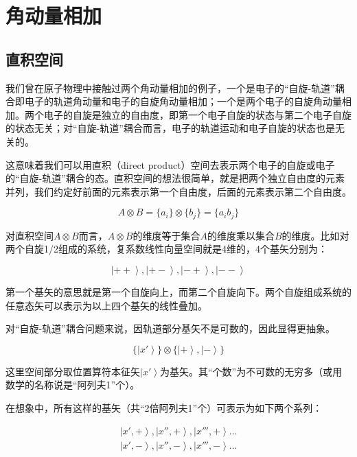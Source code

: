 \section{角动量相加}

\subsection{直积空间}

我们曾在原子物理中接触过两个角动量相加的例子，一个是电子的“自旋-轨道”耦合即电子的轨道角动量和电子的自旋角动量相加；一个是两个电子的自旋角动量相加。两个电子的自旋是独立的自由度，即第一个电子自旋的状态与第二个电子自旋的状态无关；对“自旋-轨道”耦合而言，电子的轨道运动和电子自旋的状态也是无关的。

这意味着我们可以用直积（direct product）空间去表示两个电子的自旋或电子的“自旋-轨道”耦合的态。直积空间的想法很简单，就是把两个独立自由度的元素并列，我们约定好前面的元素表示第一个自由度，后面的元素表示第二个自由度。

\begin{equation}
A \otimes B = \{ a_i \} \otimes \{ b_j \} =  \{ a_i b_j \}
\end{equation}

对直积空间$A \otimes B$而言，$A \otimes B$的维度等于集合$A$的维度乘以集合$B$的维度。比如对两个自旋1/2组成的系统，复系数线性向量空间就是4维的，4个基矢分别为：

\begin{equation*}
\left| ++ \right\rangle, \left| +- \right\rangle, \left| -+ \right\rangle, \left| -- \right\rangle 
\end{equation*}

第一个基矢的意思就是第一个自旋向上，而第二个自旋向下。两个自旋组成系统的任意态矢可以表示为以上四个基矢的线性叠加。

对“自旋-轨道”耦合问题来说，因轨道部分基矢不是可数的，因此显得更抽象。

\begin{equation}
\{ \left| x' \right\rangle  \} \otimes \{  \left| + \right\rangle , \left| - \right\rangle   \}
\end{equation}

这里空间部分取位置算符本征矢$\left| x' \right\rangle $为基矢。其“个数”为不可数的无穷多（或用数学的名称说是“阿列夫1”个）。

在想象中，所有这样的基矢（共“2倍阿列夫1”个）可表示为如下两个系列：

\begin{eqnarray*}
\left| x', +  \right\rangle, \left| x'', +  \right\rangle, \left| x''', +  \right\rangle ... \\
\left| x', -  \right\rangle, \left| x'', -  \right\rangle, \left| x''', -  \right\rangle ...
\end{eqnarray*}

